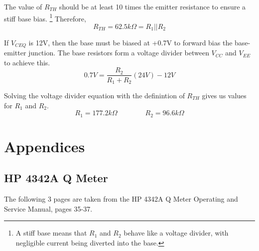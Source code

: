 \documentclass[titlepage, letterpaper, 11pt]{article}
\begin{document}
The value of $R_{TH}$ should be at least 10 times the emitter
resistance to ensure a stiff base bias. \footnote{A stiff base means
that $R_{1}$ and $R_{2}$ behave like a voltage divider, with 
negligible current being diverted into the base.} Therefore,
\begin{equation*}
R_{TH}=62.5k\Omega=R_{1}||R_{2}
\end{equation*}

If $V_{CEQ}$ is 12V, then the base must be biased at +0.7V to forward
bias the base-emitter junction. The base resistors form a voltage
divider between $V_{CC}$ and $V_{EE}$ to achieve this.
\begin{equation*}
0.7V=\frac{R_{2}}{R_{1}+R_{2}}(24V)-12V
\end{equation*}

Solving the voltage divider equation with the definintion of $R_{TH}$
gives us values for $R_{1}$ and $R_{2}$.
\begin{equation*}
R_{1}=177.2k\Omega\qquad\qquad R_{2}=96.6k\Omega
\end{equation*}

\section{Appendices}

\subsection{HP 4342A Q Meter}
\label{qMeter}

The following 3 pages are taken from the HP 4342A Q Meter Operating
and Service Manual, pages 35-37.
\end{document}
